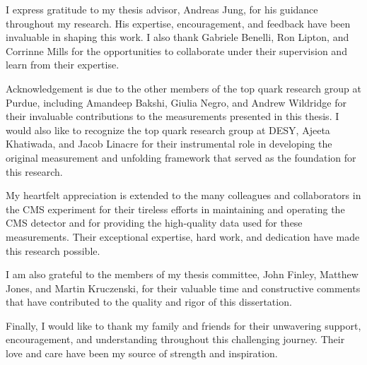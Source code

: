 \begin{acknowledgments}
I express gratitude to my thesis advisor, Andreas Jung, for his guidance throughout my research. His expertise, encouragement, and feedback have been invaluable in shaping this work. 
I also thank Gabriele Benelli, Ron Lipton, and Corrinne Mills for the opportunities to collaborate under their supervision and learn from their expertise.

Acknowledgement is due to the other members of the top quark research group at Purdue, including Amandeep Bakshi, Giulia Negro, and Andrew Wildridge for their invaluable contributions to the measurements presented in this thesis. 
I would also like to recognize the top quark research group at DESY, Ajeeta Khatiwada, and Jacob Linacre for their instrumental role in developing the original measurement and unfolding framework that served as the foundation for this research.

My heartfelt appreciation is extended to the many colleagues and collaborators in the CMS experiment for their tireless efforts in maintaining and operating the CMS detector and for providing the high-quality data used for these measurements. 
Their exceptional expertise, hard work, and dedication have made this research possible.

I am also grateful to the members of my thesis committee, John Finley, Matthew Jones, and Martin Kruczenski, for their valuable time and constructive comments that have contributed to the quality and rigor of this dissertation.

Finally, I would like to thank my family and friends for their unwavering support, encouragement, and understanding throughout this challenging journey. 
Their love and care have been my source of strength and inspiration.
\end{acknowledgments}

%

\tableofcontents

